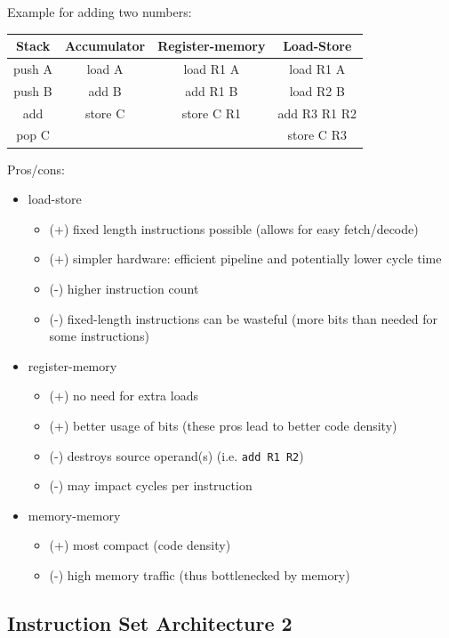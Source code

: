 \documentclass[12pt]{extarticle}
\begin{document}
	Example for adding two numbers:

	\begin{tabular}[ht!]{|c|c|c|c|} \hline
		Stack	& Accumulator	& Register-memory	& Load-Store	\\ \hline
		push A	& load A		& load R1 A			& load R1 A		\\ \hline
		push B	& add B			& add R1 B			& load R2 B		\\ \hline
		add		& store C		& store C R1		& add R3 R1 R2	\\ \hline
		pop C	& 				& 					& store C R3	\\ \hline
	\end{tabular}

	Pros/cons:

	\begin{itemize}
		\item load-store
		\begin{itemize}
			\item (+) fixed length instructions possible (allows for easy fetch/decode)
			\item (+) simpler hardware: efficient pipeline and potentially lower cycle time
			\item (-) higher instruction count
			\item (-) fixed-length instructions can be wasteful (more bits than needed for some instructions)
		\end{itemize}

		\item register-memory
		\begin{itemize}
			\item (+) no need for extra loads
			\item (+) better usage of bits (these pros lead to better code density)
			\item (-) destroys source operand(s) (i.e. \texttt{add R1 R2})
			\item (-) may impact cycles per instruction
		\end{itemize}

		\item memory-memory
		\begin{itemize}
			\item (+) most compact (code density)
			\item (-) high memory traffic (thus bottlenecked by memory)
		\end{itemize}
	\end{itemize}

	\subsection{Instruction Set Architecture 2}
\end{document}
